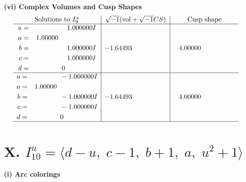 \documentclass[1p]{elsarticle_modified}
\theoremstyle{definition}
\newcommand{\I}{\sqrt{-1}}
\begin{document}
\newpage\flushleft \textbf{(vi) Complex Volumes and Cusp Shapes}
$$\begin{array}{c|c|c}  
\text{Solutions to }I^u_{9}& \I (\text{vol} + \sqrt{-1}CS) & \text{Cusp shape}\\
 \hline 
\begin{aligned}
u &= \phantom{-0.000000 -}1.000000 I \\
a &= \phantom{-}1.00000\phantom{ +0.000000I} \\
b &= \phantom{-0.000000 -}1.000000 I \\
c &= \phantom{-0.000000 -}1.000000 I \\
d &= \phantom{-0.000000 } 0\end{aligned}
 & -1.64493\phantom{ +0.000000I} & \phantom{-}4.00000\phantom{ +0.000000I} \\ \hline\begin{aligned}
u &= \phantom{-0.000000 } -1.000000 I \\
a &= \phantom{-}1.00000\phantom{ +0.000000I} \\
b &= \phantom{-0.000000 } -1.000000 I \\
c &= \phantom{-0.000000 } -1.000000 I \\
d &= \phantom{-0.000000 } 0\end{aligned}
 & -1.64493\phantom{ +0.000000I} & \phantom{-}4.00000\phantom{ +0.000000I}\\
 \hline 
 \end{array}$$\newpage\newpage\renewcommand{\arraystretch}{1}
\centering \section*{X. $I^u_{10}= \langle d- u,\;c-1,\;b+1,\;a,\;u^2+1 \rangle$}
\flushleft \textbf{(i) Arc colorings}\\
\end{document}
